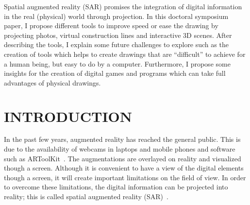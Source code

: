 \documentclass{article}
\begin{document}
\maketitle

\abstract

Spatial augmented reality (SAR) promises the integration of digital information 
in the real (physical) world through projection. In this doctoral symposium paper,
I propose different tools to improve speed or ease the drawing by projecting photos, 
virtual construction lines and interactive 3D scenes. After describing the tools, I 
explain some future challenges to explore such as the creation of tools which helps to create 
drawings that are “difficult” to achieve for a human being, but easy to do by a computer. 
Furthermore, I propose some insights for the creation of digital games and programs which 
can take full advantages of physical drawings.





\section{INTRODUCTION}

In the past few years, augmented reality has reached the general public. This is due to the availability 
of webcams in laptops and mobile phones and software such as ARToolKit~\cite{wagner2007artoolkitplus}.
The augmentations are overlayed on reality and visualized though a screen. 
Although it is convenient to have a view of the digital elements though a screen, it will create important limitations on the field of view. In order to overcome these limitations, the digital information can be projected into reality; this is called spatial augmented reality (SAR)~\cite{raskar1999table}.
\end{document}
